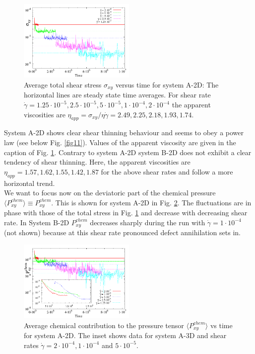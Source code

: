 \documentclass[8.5pt,twoside,twocolumn]{article}
\newcommand{\e}[1]{\cdot10^{#1}}
\newcommand{\gd}{\dot{\gamma}}
\begin{document}
\begin{figure}[htp!]
\centering
\includegraphics[angle=0,width=0.5\textwidth]{S_xy_tot_t_5e-4.pdf}
\caption{Average total shear stress $\sigma_{xy}$ versus time for system A-2D: The horizontal lines are steady state time averages. For shear rate $\dot{\gamma}=1.25\e{-5}, 2.5\e{-5}, 5\e{-5}, 1\e{-4}, 2\e{-4}$ the apparent viscosities are $\eta_{app}=\sigma_{xy}/ \eta \dot{\gamma}=2.49, 2.25, 2.18, 1.93, 1.74$.
 }
\label{fig7}
\end{figure}

System A-2D shows clear shear thinning behaviour and seems to obey a power law (see below Fig. \ref{fig11}).
Values of the apparent viscosity are given in the caption of Fig. \ref{fig7}.
Contrary to system A-2D system B-2D does not exhibit a clear tendency of shear thinning.
Here, the apparent viscosities are $\eta_{app}=1.57, 1.62, 1.55, 1.42, 1.87$ for the above shear rates and follow a more horizontal trend.\\
We want to focus now on the deviatoric part of the chemical pressure $\langle P^{chem}_{xy}\rangle\equiv P^{chem}_{xy}$.
This is shown for system A-2D in Fig. \ref{fig8}.
The fluctuations are in phase with those of the total stress in Fig. \ref{fig7} and decrease with decreasing shear rate.
In System B-2D $P^{chem}_{xy}$ decreases sharply during the run with $\gd=1\e{-4}$ (not shown) because at this shear rate pronounced defect annihilation sets in.\\

\begin{figure}[htp!]
\centering
\includegraphics[angle=0,width=0.5\textwidth]{P_xy_chem_t_5e-4.pdf}
\caption{Average chemical contribution to the pressure tensor $\langle P_{xy}^{chem}\rangle$ vs time for system A-2D. The inset shows data for system A-3D and shear rates $\dot{\gamma}=2\cdot10^{-4}, 1\cdot10^{-4}$ and $5\cdot10^{-5}$.}
\label{fig8}
\end{figure}
\end{document}
